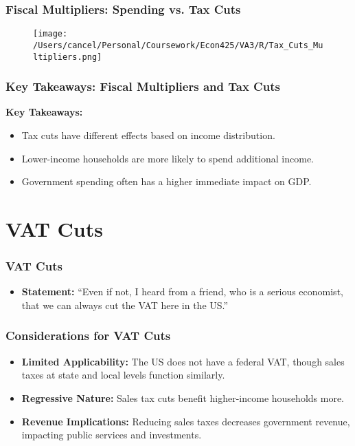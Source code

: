 \documentclass{beamer}
\begin{document}
\begin{frame}
    \frametitle{Fiscal Multipliers: Spending vs. Tax Cuts}
    \begin{figure}[h!]
        \centering
        \texttt{[image: /Users/cancel/Personal/Coursework/Econ425/VA3/R/Tax\_Cuts\_Multipliers.png]}
    \end{figure}
\end{frame}

\begin{frame}
    \frametitle{Key Takeaways: Fiscal Multipliers and Tax Cuts}
    \textbf{Key Takeaways:}
    \begin{itemize}
        \item Tax cuts have different effects based on income distribution.
        \item Lower-income households are more likely to spend additional income.
        \item Government spending often has a higher immediate impact on GDP.
    \end{itemize}
\end{frame}

\section{VAT Cuts}

\begin{frame}
    \frametitle{VAT Cuts}
    \begin{itemize}
        \item \textbf{Statement:} ``Even if not, I heard from a friend, who is a serious economist, that we can always cut the VAT here in the US.''
    \end{itemize}
\end{frame}

\begin{frame}
    \frametitle{Considerations for VAT Cuts}
    \begin{itemize}
        \item \textbf{Limited Applicability:} The US does not have a federal VAT, though sales taxes at state and local levels function similarly.
        \item \textbf{Regressive Nature:} Sales tax cuts benefit higher-income households more.
        \item \textbf{Revenue Implications:} Reducing sales taxes decreases government revenue, impacting public services and investments.
    \end{itemize}
\end{frame}
\end{document}
